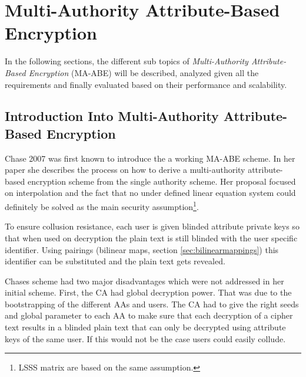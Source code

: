\section{Multi-Authority Attribute-Based Encryption}
In the following sections, the different sub topics of \textit{Multi-Authority Attribute-Based Encryption} (\ac{MA-ABE}) will be described, analyzed given all the requirements and finally evaluated based on their performance and scalability. 

\subsection{Introduction Into Multi-Authority Attribute-Based Encryption}
Chase 2007 \cite{chase2007multi} was first known to introduce the a working \ac{MA-ABE} scheme. In her paper she describes the process on how to derive a multi-authority attribute-based encryption scheme from the single authority scheme. Her proposal focused on interpolation and the fact that no under defined linear equation system could definitely be solved as the main security assumption\footnote{\ac{LSSS} matrix are based on the same assumption.}.  

To ensure collusion resistance, each user is given blinded attribute private keys so that when used on decryption the plain text is still blinded with the user specific identifier. Using pairings (bilinear maps, section \ref{sec:bilinearmappings}) this identifier can be substituted and the plain text gets revealed. 

Chases scheme had two major disadvantages which were not addressed in her initial scheme. First, the \ac{CA} had global decryption power. That was due to the bootstrapping of the different AAs and users. The CA had to give the right seeds and global parameter to each AA to make sure that each decryption of a cipher text results in a blinded plain text that can only be decrypted using attribute keys of the same user. If this would not be the case users could easily collude. 


